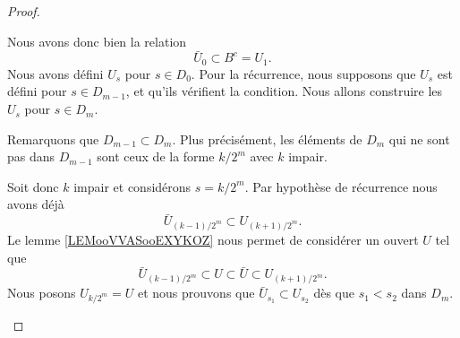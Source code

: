 \begin{proof}
\begin{subproof}
		Nous avons donc bien la relation
		\begin{equation}
			\bar U_0\subset B^c=U_1.
		\end{equation}
		\spitem[Récurrence]
		Nous avons défini \( U_s\) pour \( s\in D_0\). Pour la récurrence, nous supposons que \( U_s\) est défini pour \( s\in D_{m-1}\), et qu'ils vérifient la condition. Nous allons construire les \( U_s\) pour \( s\in D_m\).

		Remarquons que \( D_{m-1}\subset D_m\). Plus précisément, les éléments de \( D_m\) qui ne sont pas dans \( D_{m-1} \) sont ceux de la forme \( k/2^m\) avec \( k\) impair.

		Soit donc \( k\) impair et considérons \( s=k/2^m\). Par hypothèse de récurrence nous avons déjà
		\begin{equation}
			\bar U_{(k-1)/2^m}\subset U_{(k+1)/2^m}.
		\end{equation}
		Le lemme \ref{LEMooVVASooEXYKOZ} nous permet de considérer un ouvert \( U\) tel que
		\begin{equation}
			\bar U_{(k-1)/2^m}\subset U\subset \bar U\subset U_{(k+1)/2^m}.
		\end{equation}
		Nous posons \( U_{k/2^m}=U\) et nous prouvons que \( \bar U_{s_1}\subset U_{s_2}\) dès que \( s_1<s_2\) dans \( D_m\).


\end{subproof}
\end{proof}
